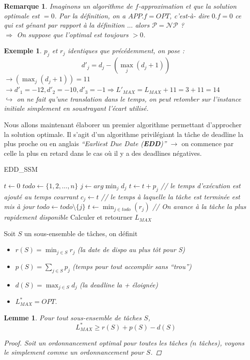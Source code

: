 \documentclass{article}
\newtheorem{exemple}{Exemple}[section]
\newtheorem{rem}{Remarque}[section]
\newtheorem{lemme}{Lemme}[section]
\newtheorem{proof}{Preuve}[section]
\begin{document}
\begin{sffamily}
\begin{rem}
Imaginons un algorithme de $f$-\textit{approximation} et que la solution optimale est $=0$. Par la définition, on a $APP.f=OPT$, c'est-à-
dire $0.f = 0$ ce qui est génant par rapport à la définition $\ldots$ alors $\mathcal{P} = \mathcal{NP}$ ? \\
$\Rightarrow$ On suppose que l'optimal est toujours $> 0$.
\end{rem}

\begin{exemple}
$p_j$ et $r_j$ identiques que précédemment, on pose :
		  $$d'_j = d_j - (\max_j (d_j + 1))$$
$\rightarrow (\max_j (d_j + 1)) = 11$\\
$\rightarrow d'_1 = -12, d'_2 = -10, d'_3 = -1 \Rightarrow L'_{MAX} = L_{MAX} + 11 = 3+11 = 14$ \\
$\hookrightarrow$ on ne fait qu'une translation dans le temps, on peut retomber sur l'instance initiale simplement en soustrayant l'écart
utilisé.
\end{exemple}

Nous allons maintenant élaborer un premier algorithme permettant d'approcher la solution optimale. Il s'agit d'un algorithme privilégiant
la tâche de deadline la plus proche ou en anglais \textit{``Earliest Due Date (\textbf{EDD})''} $\rightarrow$ on commence par celle la
plus en retard dans le cas où il y a des deadlines négatives.

\begin{algorithm}[h!]
\caption{EDD\_SSM}
\begin{algorithmic}[1]
\STATE $t\leftarrow 0$
\STATE $todo \leftarrow \{1,2,\ldots,n\}$
\STATE $j\leftarrow arg\min_j{d_j}$
\STATE $t\leftarrow t+p_j$ \textit{// le temps d'exécution est ajouté au temps courrant}
\STATE $c_j \leftarrow t$ \textit{// le temps à laquelle la tâche est terminée est mis à jour}
\STATE $todo \leftarrow todo \setminus \{j\}$
\ELSE
\STATE $t\leftarrow \min_{j\in todo}(r_j)$ \textit{// On avance à la tâche la plus rapidement disponible}
\ENDIF
\ENDWHILE
\STATE Calculer et retourner $L_{MAX}$
\end{algorithmic}
\end{algorithm}

Soit $S$ un sous-ensemble de tâches, on définit
\begin{itemize}
\item $r(S) = \min_{j\in S} r_j$ \textit{(la date de dispo au plus tôt pour S)}
\item $p(S) = \sum_{j\in S} p_j$ \textit{(temps pour tout accomplir sans ``trou'')}
\item $d(S) = \max_{j\in S} d_j$ \textit{(la deadline la + éloignée)}
\item $L^*_{MAX} = OPT$.
\end{itemize}
\newpage
\begin{lemme} Pour tout sous-ensemble de tâches $S$,
$$ L^*_{MAX} \geq r(S) + p(S) - d(S) $$
\begin{proof}
Soit un ordonnancement optimal pour toutes les tâches ($n$ tâches), voyons le simplement comme un ordonnancement pour $S$.


\end{proof}
\end{lemme}
\end{sffamily}
\end{document}
